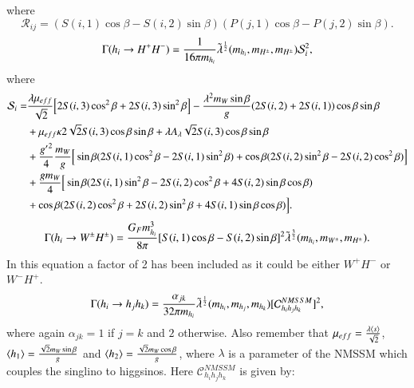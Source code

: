 \documentclass[final,3p,times]{elsarticle}
\begin{document}
where
\begin{equation}
\mathcal{R}_{ij} = (S(i,1)\cos\beta - S(i,2)\sin\beta)(P(j,1)\cos\beta - P(j,2)\sin\beta).
\end{equation}
\begin{equation} \label{hHpmHpmNMSSM}
\Gamma(h_i \rightarrow H^+ H^-) = {1 \over 16 \pi m_{h_i}} \tilde{\lambda}^{1 \over 2}(m_{h_i},m_{H^{\pm}},m_{H^{\pm}}) \mathcal{S}_{i}^2,
\end{equation}
where
\begin{equation}
\begin{aligned}
\mathcal{S}_i = & {\lambda \mu_{eff} \over \sqrt{2}}\Big[2S(i,3)\cos^2 \beta + 2S(i,3) \sin^2 \beta\Big] - {\lambda^2 m_{W} \sin\beta \over g}(2S(i,2) + 2S(i,1))\cos\beta \sin\beta \\ & + \mu_{eff} \kappa 2\sqrt{2}S(i,3)\cos\beta \sin\beta  + \lambda A_{\lambda} \sqrt{2} S(i,3)\cos\beta \sin\beta \\ & + {{g'}^2 \over 4}{m_{W} \over g}\Big[\sin\beta (2S(i,1)\cos^2 \beta - 2S(i,1)\sin^2 \beta) + \cos\beta(2S(i,2)\sin^2 \beta - 2S(i,2) \cos^2 \beta)\Big] \\ & + {g m_{W} \over 4}\Big[\sin\beta(2S(i,1) \sin^2 \beta - 2S(i,2)\cos^2 \beta + 4S(i,2)\sin\beta\cos\beta) \\ & + \cos\beta(2S(i,2) \cos^2 \beta + 2S(i,2)\sin^2 \beta + 4S(i,1)\sin\beta \cos\beta)\Big].
\end{aligned}
\end{equation}
\begin{equation} \label{hWHpmNMSSM}
\Gamma(h_{i} \rightarrow W^{\pm} H^{\pm}) = {G_{F} m_{h_i}^3 \over 8 \pi}[S(i,1)\cos\beta - S(i,2)\sin\beta]^2 \tilde{\lambda}^{3 \over 2} (m_{h_i},m_{W^{\pm}},m_{H^{\pm}}).
\end{equation}
In this equation a factor of 2 has been included as it could be either $W^+ H^-$ or $W^- H^+$.
\begin{equation} \label{hHH3NMSSM}
\Gamma(h_i \rightarrow h_j h_k) = {\alpha_{jk} \over 32 \pi m_{h_i}} \tilde{\lambda}^{1 \over 2}(m_{h_{i}},m_{h_{j}}, m_{h_{k}}) [\mathcal{C}_{h_{i}h_{j}h_{k}}^{NMSSM}]^2 ,
\end{equation}
where again $\alpha_{jk} = 1$ if $j=k$ and $2$ otherwise. Also remember that $\mu_{eff} = {\lambda \langle s \rangle \over \sqrt{2}}$, $\langle h_1 \rangle = {\sqrt{2}m_W \sin\beta \over g}$ and $\langle h_2 \rangle = {\sqrt{2}m_W \cos\beta \over g}$, where $\lambda$ is a parameter of the NMSSM which couples the singlino to higgsinos.
Here $\mathcal{C}_{h_{i}h_{j}h_{k}}^{NMSSM}$ is given by:
\end{document}
